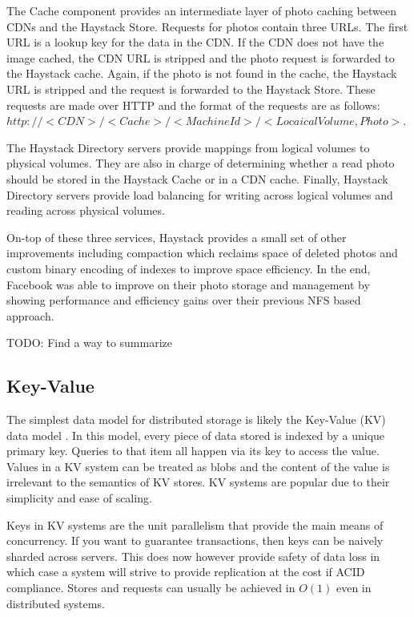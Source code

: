 \documentclass[]{article}
\begin{document}
The Cache component provides an intermediate layer of photo caching between CDNs and the Haystack Store. Requests for photos contain three URLs. The first URL is a lookup key for the data in the CDN. If the CDN does not have the image cached, the CDN URL is stripped and the photo request is forwarded to the Haystack cache. Again, if the photo is not found in the cache, the Haystack URL is stripped and the request is forwarded to the Haystack Store. These requests are made over HTTP and the format of the requests are as follows: $http://<CDN>/<Cache>/<Machine Id>/<Locaical Volume, Photo>$.

The Haystack Directory servers provide mappings from logical volumes to physical volumes. They are also in charge of determining whether a read photo should be stored in the Haystack Cache or in a CDN cache. Finally, Haystack Directory servers provide load balancing for writing across logical volumes and reading across physical volumes.

On-top of these three services, Haystack provides a small set of other improvements including compaction which reclaims space of deleted photos and custom binary encoding of indexes to improve space efficiency. In the end, Facebook was able to improve on their photo storage and management by showing performance and efficiency gains over their previous NFS based approach.

TODO: Find a way to summarize

\subsection{Key-Value}
The simplest data model for distributed storage is likely the Key-Value (KV) data model \cite{weber_nosql_2010}. In this model, every piece of data stored is indexed by a unique primary key. Queries to that item all happen via its key to access the value. Values in a KV system can be treated as blobs and the content of the value is irrelevant to the semantics of KV stores. KV systems are popular due to their simplicity and ease of scaling.

Keys in KV systems are the unit parallelism that provide the main means of concurrency. If you want to guarantee transactions, then keys can be naively sharded across servers. This does now however provide safety of data loss in which case a system will strive to provide replication at the cost if ACID compliance. Stores and requests can usually be achieved in $O(1)$ even in distributed systems\cite{ravendb}.
\end{document}
